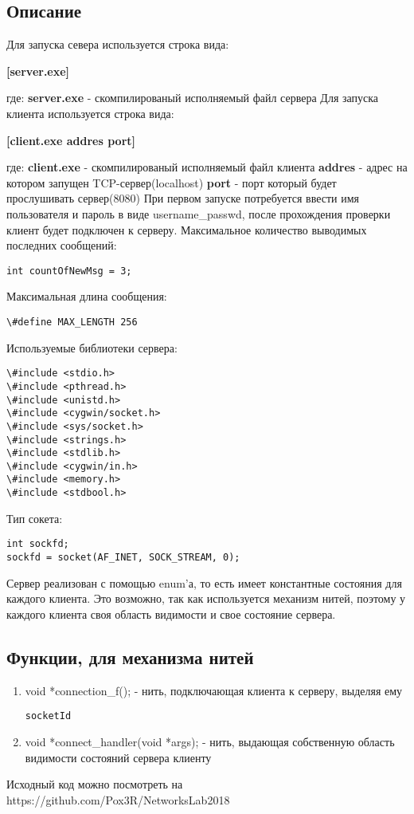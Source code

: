 \documentclass[a4paper,12pt]{extarticle}
\begin{document}
\subsection{Описание}
Для запуска севера используется строка вида:
\begin{center}\large\textbf{[server.exe]}\end{center}
где:
\newline
\textbf{server.exe} - скомпилированый исполняемый файл сервера
\newline
Для запуска клиента используется строка вида:
\begin{center}\large\textbf{[client.exe addres port]}\end{center}
где:
\newline
\textbf{client.exe} - скомпилированый исполняемый файл клиента
\newline
\textbf{addres} - адрес на котором запущен TCP-сервер(localhost)
\newline
\textbf{port} - порт который будет прослушивать сервер(8080)
\newline
При первом запуске потребуется ввести имя пользователя и пароль в виде username\_passwd, после прохождения проверки клиент будет подключен к серверу.
Максимальное количество выводимых последних сообщений:
\begin{verbatim}
int countOfNewMsg = 3;
\end{verbatim}
Максимальная длина сообщения:
\begin{verbatim}
\#define MAX_LENGTH 256
\end{verbatim}
Используемые библиотеки сервера:
\begin{verbatim}
\#include <stdio.h>
\#include <pthread.h>
\#include <unistd.h>
\#include <cygwin/socket.h>
\#include <sys/socket.h>
\#include <strings.h>
\#include <stdlib.h>
\#include <cygwin/in.h>
\#include <memory.h>
\#include <stdbool.h>
\end{verbatim}
Тип сокета:
\begin{verbatim}
int sockfd;
sockfd = socket(AF_INET, SOCK_STREAM, 0);
\end{verbatim}

Сервер реализован с помощью enum'а, то есть имеет константные состояния для каждого клиента. Это возможно, так как используется механизм нитей, поэтому у каждого клиента своя область видимости и свое состояние сервера.
\subsection{Функции, для механизма нитей}
\begin{enumerate}
\item void *connection\_f(); - нить, подключающая клиента к серверу, выделяя ему \begin{verbatim}socketId\end{verbatim}
\item void *connect\_handler(void *args); - нить, выдающая собственную область видимости состояний сервера клиенту
\end{enumerate}
Исходный код можно посмотреть на https://github.com/Pox3R/NetworksLab2018
\end{document}
